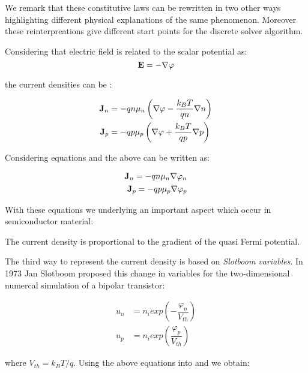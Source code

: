 We remark that these constitutive laws can be rewritten in two other ways highlighting different physical explanations of the same phenomenon. Moreover these reinterpreations  give different start points for the discrete solver algorithm.

Considering that electric field is related to the scalar potential as:
\begin{equation}
\label{eq: relazione pot electric}
\mathbf{E}  = -\nabla \varphi
\end{equation}

the current densities can be :

\begin{align}
\mathbf{J}_n &= -qn\mu_n\left(\nabla \varphi - \dfrac{k_BT}{qn}\nabla n \right) \label{eq: Jn DD} \\ 
\mathbf{J}_p &= -qp\mu_p\left(\nabla \varphi+ \dfrac{k_BT}{qp} \nabla p \right) \label{eq: Jp DD}
\end{align}

Considering equations  and  the above can be written as:

\begin{align}
\mathbf{J}_n = -qn\mu_n\nabla \varphi_n \label{eq: Jn qf}\\
\mathbf{J}_p = -qp\mu_p\nabla \varphi_p \label{eq: Jp qf}
\end{align}

With these equations we underlying an important aspect which occur in semiconductor material:
\begin{Osservazione}
The current density is proportional to the gradient of the quasi Fermi potential.
\end{Osservazione}

The third way to represent the current density is based on \textit{Slotboom variables}. In 1973 Jan Slotboom proposed this change in variables for the two-dimensional numercal simulation of a bipolar transistor:

\begin{align}
u_n &= n_iexp\left(-\dfrac{\varphi_n}{V_{th}} \right) \label{eq: un slotboom} \\
u_p &= n_iexp\left(\dfrac{\varphi_p}{V_{th}} \right) \label{eq: up slotboom} 
\end{align}

where $V_{th}=k_BT/q$. Using the above equations into  and  we obtain:

